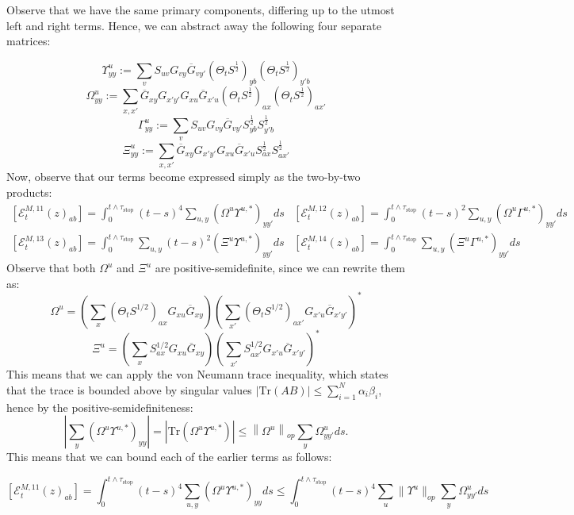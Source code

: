 \documentclass[11pt]{article}
\newcommand{\sto}{\text{stop}}
\begin{document}
\noindent Observe that we have the same primary components, differing up to the utmost left and right terms. Hence, we can abstract away the following four separate matrices: 

$$\Upsilon_{yy}^u := \sum_v S_{uv} G_{vy} \overline{G}_{vy'} (\Theta_t S^{\frac{1}{2}})_{yb} (\Theta_t S^{\frac{1}{2}})_{y'b}$$
$$\Omega_{yy}^u := \sum_{x,x'} \overline{G}_{xy} G_{x'y'} G_{xu} \overline{G}_{x'u} (\Theta_t S^{\frac{1}{2}})_{ax} (\Theta_t S^{\frac{1}{2}})_{ax'}$$
$$\Gamma_{yy}^u := \sum_v S_{uv} G_{vy} \overline{G}_{vy'} S^{\frac{1}{2}}_{yb} S^{\frac{1}{2}}_{y'b}$$
$$\Xi_{yy}^u := \sum_{x,x'} \overline{G}_{xy} G_{x'y'} G_{xu} \overline{G}_{x'u} S^{\frac{1}{2}}_{ax} S^{\frac{1}{2}}_{ax'}$$
Now, observe that our terms become expressed simply as the two-by-two products:
\begin{equation*}
\begin{array}{ll}
 \left[\mathcal{E}_{t}^{M, 11}(z)_{ab}\right] = \int_0^{t\wedge \tau_\sto} (t-s)^4\sum_{u, y} (\Omega^u\Upsilon^{u, *})_{yy'}ds &  \left[\mathcal{E}_{t}^{M, 12}(z)_{ab}\right] = \int_0^{t\wedge \tau_\sto} (t-s)^2\sum_{u, y} (\Omega^u\Gamma^{u, *})_{yy'}ds \\
 \left[\mathcal{E}_{t}^{M, 13}(z)_{ab}\right] = \int_0^{t\wedge \tau_\sto} \sum_{u, y} (t-s)^2(\Xi^u\Upsilon^{u, *})_{yy'}ds  & \left[\mathcal{E}_{t}^{M, 14}(z)_{ab}\right] = \int_0^{t\wedge \tau_\sto} \sum_{u, y} (\Xi^u\Gamma^{u, *})_{yy'}ds
\end{array}\end{equation*}
Observe that both $\Omega^u$ and $\Xi^u$ are positive-semidefinite, since we can rewrite them as:
$$\Omega^u = \left(\sum_x (\Theta_t S^{1/2})_{ax}G_{xu}\overline{G}_{xy}\right)\left(\sum_{x'} (\Theta_t S^{1/2})_{ax'}G_{x'u}\overline{G}_{x'y'}\right)^*$$
$$\Xi^u = \left(\sum_x  S^{1/2}_{ax}G_{xu}\overline{G}_{xy}\right)\left(\sum_{x'} S^{1/2}_{ax'}G_{x'u}\overline{G}_{x'y'}\right)^*$$
This means that we can apply the von Neumann trace inequality, which states that the trace is bounded above by singular values $\left\vert\text{Tr}(AB)\right\vert\leq \sum_{i=1}^N \alpha_i\beta_i$, hence by the positive-semidefiniteness: 
$$\left\vert\sum_y\left(\Omega^u\Upsilon^{u, *}\right)_{yy}\right\vert = \left\vert\text{Tr}\left(\Omega^u\Upsilon^{u, *}\right)\right\vert\leq \left\|\Omega^u\right\|_{op}\sum_{y}\Omega_{yy'}^uds.$$
This means that we can bound each of the earlier terms as follows:

$$\left[\mathcal{E}_{t}^{M, 11}(z)_{ab}\right] = \int_0^{t\wedge \tau_\sto} (t-s)^4\sum_{u, y} (\Omega^u\Upsilon^{u, *})_{yy}ds\leq \int_0^{t\wedge \tau_\sto} (t-s)^4\sum_u \|\Upsilon^u\|_{op}\sum_y \Omega_{yy'}^uds$$
\end{document}
